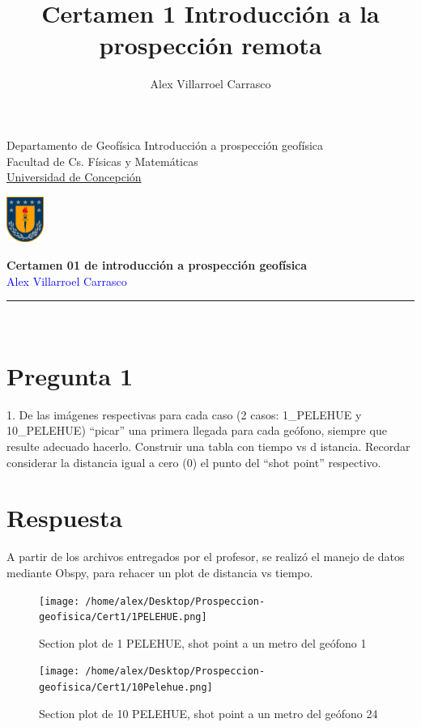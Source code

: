 \documentclass{article}
\title{Certamen 1 Introducción a la prospección remota}
\author{Alex Villarroel Carrasco}
\theoremstyle{mytheoremstyle}
\theoremstyle{mytheoremstyle}
\theoremstyle{myproblemstyle}
\begin{document}
\usetikzlibrary{positioning}
	\pagestyle{plain}
	\begin{flushleft}
		Departamento de Geofísica \hfill Introducción a prospección geofísica\\
		Facultad de Cs. Físicas y Matemáticas\\
		\underline{Universidad de Concepción}
	\end{flushleft}
	
	\begin{flushright}\vspace{-5mm}
		\includegraphics[height=1.5cm]{escudo.png}
	\end{flushright}
	
	\begin{center}\vspace{-1cm}
		\textbf{\large Certamen 01 de introducción a prospección geofísica}\\
		{\textcolor{blue}{Alex Villarroel Carrasco}}\\
	\end{center}
	\rule{\linewidth}{0.1mm}
	\\
    \section*{Pregunta 1}
	 1. De las imágenes respectivas para cada caso (2 casos: 1\_PELEHUE y 10\_PELEHUE)
		“picar” una primera llegada para cada geófono, siempre que resulte adecuado
		hacerlo. Construir una tabla con tiempo vs d istancia. Recordar considerar la
		distancia igual a cero (0) el punto del “shot point” respectivo.
	\section*{Respuesta}
	
	A partir de los archivos entregados por el profesor, se realizó el manejo de datos mediante Obspy, para rehacer un plot de distancia vs tiempo.
	\begin{figure}[h]
		\texttt{[image: /home/alex/Desktop/Prospeccion-geofisica/Cert1/1PELEHUE.png]}
		\caption{Section plot de 1 PELEHUE, shot point a un metro del geófono 1}
	\end{figure}
	\begin{figure}[h]
		\texttt{[image: /home/alex/Desktop/Prospeccion-geofisica/Cert1/10Pelehue.png]}
		\caption{Section plot de 10 PELEHUE, shot point a un metro del geófono 24}
	\end{figure}
\end{document}
